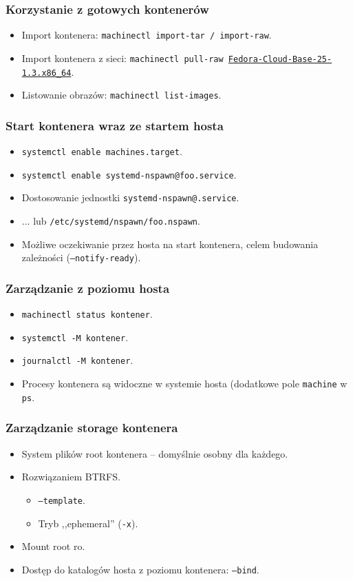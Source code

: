 \documentclass[dvipsnames,table]{beamer}
\begin{document}
\begin{frame}
\frametitle{Korzystanie z gotowych kontenerów}
\begin{itemize}
	\item Import kontenera: {\tt machinectl import-tar / import-raw}.
	\item Import kontenera z sieci: {\tt machinectl pull-raw \href{https://dl.fedoraproject.org/pub/fedora/linux/releases/25/CloudImages/x86\_64/images/Fedora-Cloud-Base-25-1.3.x86\_64.raw.xz}{Fedora-Cloud-Base-25-1.3.x86\_64}}.
	\item Listowanie obrazów: {\tt machinectl list-images}.
\end{itemize}
\end{frame}

\begin{frame}
\frametitle{Start kontenera wraz ze startem hosta}
\begin{itemize}
	\item {\tt systemctl enable machines.target}.
	\item {\tt systemctl enable systemd-nspawn@foo.service}.
	\item Dostosowanie jednostki {\tt systemd-nspawn@.service}.
	\item ... lub {\tt /etc/systemd/nspawn/foo.nspawn}.
	\item Możliwe oczekiwanie przez hosta na start kontenera, celem budowania zależności ({\tt --notify-ready}).
\end{itemize}
\end{frame}

\begin{frame}
\frametitle{Zarządzanie z poziomu hosta}
\begin{itemize}
	\item {\tt machinectl status kontener}.
	\item {\tt systemctl -M kontener}.
	\item {\tt journalctl -M kontener}.
	\item Procesy kontenera są widoczne w systemie hosta (dodatkowe pole {\tt machine} w {\tt ps}.
\end{itemize}
\end{frame}

\begin{frame}
\frametitle{Zarządzanie storage kontenera}
\begin{itemize}
	\item System plików root kontenera -- domyślnie osobny dla każdego.
	\item Rozwiązaniem BTRFS.
	\begin{itemize}
		\item {\tt --template}.
		\item Tryb ,,ephemeral'' ({\tt -x}).
	\end{itemize}
	\item Mount root ro.
	\item Dostęp do katalogów hosta z poziomu kontenera: {\tt --bind}.
\end{itemize}
\end{frame}
\end{document}
